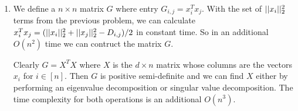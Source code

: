 \begin{enumerate}
    \item We define a $n \times n$ matrix $G$ where entry
    $G_{i,j} = x_i^T x_j$.
    With the set of $||x_i||_2^2$ terms from the previous problem,
    we can calculate $x_i^T x_j = (||x_i||_2^2 + ||x_j||_2^2 - D_{i,j})/2$
    in constant time.
    So in an additional $O(n^2)$ time we can contruct the matrix $G$.

    Clearly $G = X^T X$ where $X$ is the $d \times n$ matrix whose columns
    are the vectors $x_i$ for $i \in [n]$.
    Then $G$ is positive semi-definite and we can find $X$ either by
    performing an eigenvalue decomposition or singular value decomposition.
    The time complexity for both operations is an additional $O(n^3)$.
\end{enumerate}



